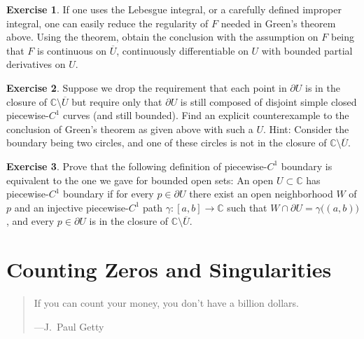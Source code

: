 \documentclass[12pt,openany]{book}
\newcommand{\widebar}[1]{\overline{#1}}
\newcommand{\C}{{\mathbb{C}}}
\theoremstyle{plain}
\theoremstyle{remark}
\theoremstyle{definition}
\newenvironment{exbox}{%
    \def\FrameCommand{\vrule width 1pt \relax\hspace{10pt}}%
    \MakeFramed{\advance\hsize-\width\FrameRestore}%
}{%
    \endMakeFramed
}
\newenvironment{myepigraph}{%
    \begin{quote}%
    \begingroup\itshape
}{%
    \endgroup%
    \end{quote}
}
\theoremstyle{exercise}
\newtheorem{exercise}{Exercise}[section]
\theoremstyle{example}
\begin{document}
\begin{exbox}
\begin{exercise}
\pagebreak[2]
If one uses the Lebesgue integral, or a carefully defined improper integral,
one can easily reduce the regularity of $F$ needed in Green's theorem above.
Using the theorem, obtain the conclusion with the
assumption on $F$ being that $F$ is continuous on $\widebar{U}$,
continuously differentiable on $U$ with bounded partial derivatives on $U$.
\end{exercise}

\begin{exercise}
Suppose we drop the requirement that each point in $\partial U$ is in the
closure of $\C \setminus \widebar{U}$ but require only that $\partial U$ is still
composed of disjoint simple closed piecewise-$C^1$ curves (and still bounded).
Find an explicit counterexample to the conclusion of
Green's theorem as given above with such a $U$.
Hint: Consider the boundary being two
circles, and one of these circles is not in the closure of 
$\C \setminus \widebar{U}$.
\end{exercise}

\begin{exercise}
Prove that the following definition of piecewise-$C^1$ boundary is
equivalent to the one we gave for bounded open sets:  An open $U \subset
\C$ has piecewise-$C^1$ boundary if for every $p \in \partial U$
there exist an open neighborhood $W$ of $p$ and an injective piecewise-$C^1$ path $\gamma
\colon [a,b] \to \C$ such that $W \cap \partial U =
\gamma\bigl((a,b)\bigr)$, and every $p \in \partial U$ is in the closure
of $\C \setminus \widebar{U}$.
\end{exercise}
\end{exbox}


\chapter{Counting Zeros and Singularities} \label{ch:counting}

\begin{myepigraph}
If you can count your money, you don't have a billion dollars.

---J.\ Paul Getty
\end{myepigraph}
\end{document}
